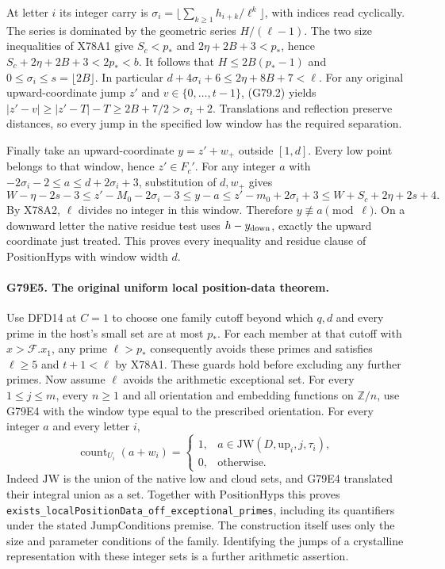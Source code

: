 At letter $i$ its integer carry is
$\sigma_i=\lfloor\sum_{k\ge1}h_{i+k}/\ell^k\rfloor$, with indices
read cyclically. The series is dominated by the geometric series
$H/(\ell-1)$. The two size inequalities of X78A1 give
$S_c<p_*$ and $2\eta+2B+3<p_*$, hence
$S_c+2\eta+2B+3<2p_*<b$. It follows that
$H\le 2B(p_*-1)$ and $0\le\sigma_i\le s=\lfloor2B\rfloor$.
In particular $d+4\sigma_i+6\le2\eta+8B+7<\ell$.
For any original upward-coordinate jump $z'$ and
$v\in\{0,\ldots,t-1\}$, (G79.2) yields
$|z'-v|\ge |z'-T|-T\ge 2B+7/2>\sigma_i+2$.
Translations and reflection preserve distances, so every jump in
the specified low window has the required separation.

Finally take an upward-coordinate $y=z'+w_+$ outside $[1,d]$.
Every low point belongs to that window, hence $z'\in F_c'$.
For any integer $a$ with $-2\sigma_i-2\le a\le d+2\sigma_i+3$,
substitution of $d,w_+$ gives
\[
 W-\eta-2s-3\le z'-M_0-2\sigma_i-3
     \le y-a\le z'-m_0+2\sigma_i+3
     \le W+S_c+2\eta+2s+4 .
\]
By X78A2, $\ell$ divides no integer in this window. Therefore
$y\not\equiv a\pmod\ell$. On a downward letter the native
residue test uses $h-y_{\rm down}$, exactly the upward coordinate
just treated. This proves every inequality and residue clause of
$\mathrm{PositionHyps}$ with window width $d$.

\paragraph{G79E5. The original uniform local position-data theorem.}
Use DFD14 at $C=1$ to choose one family cutoff beyond which $q,d$
and every prime in the host's small set are at most $p_*$.
For each member at that cutoff with $x>\mathcal F.x_1$, any prime
$\ell>p_*$ consequently avoids these primes and satisfies
$\ell\ge5$ and $t+1<\ell$ by X78A1. These guards hold before
excluding any further primes. Now assume $\ell$ avoids the arithmetic
exceptional set. For every $1\le j\le m$, every $n\ge1$ and all
orientation and embedding functions on $\mathbb Z/n$, use G79E4
with the window type equal to the prescribed orientation.
For every integer $a$ and every letter $i$,
\[
  \operatorname{count}_{U_i}(a+w_i)
  =\begin{cases}
     1,&a\in\mathrm{JW}(D,\mathrm{up}_i,j,\tau_i),\\
     0,&\text{otherwise}.
   \end{cases}
\]
Indeed $\mathrm{JW}$ is the union of the native low and cloud
sets, and G79E4 translated their integral union as a set.
Together with $\mathrm{PositionHyps}$ this proves
\texttt{exists\_localPositionData\_}\allowbreak\texttt{off\_exceptional\_primes},
including its quantifiers under the stated $\mathrm{JumpConditions}$
premise. The construction itself uses only the size and parameter
conditions of the family. Identifying the jumps of a crystalline
representation with these integer sets is a further arithmetic assertion.

